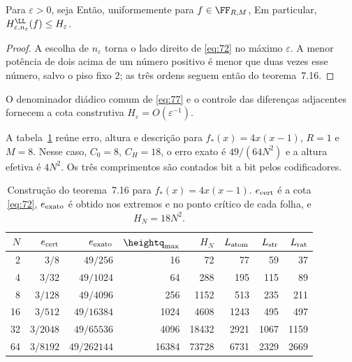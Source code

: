 \begin{corolario}
Para $\varepsilon>0$, seja
Então, uniformemente para $f\in\FF_{R,M}$,
Em particular, $H^{\LL}_{\varepsilon,n_\varepsilon}(f)\le H_\varepsilon$.
\end{corolario}
\begin{proof}
A escolha de $n_\varepsilon$ torna o lado direito de \eqref{eq:72} no máximo $\varepsilon$. A menor potência de dois acima de um número positivo é menor que duas vezes esse número, salvo o piso fixo $2$; as três ordens seguem então do teorema~7.16.
\end{proof}
O denominador diádico comum de \eqref{eq:77} e o controle das diferenças adjacentes fornecem a cota construtiva $H_\varepsilon=O(\varepsilon^{-1})$.

A tabela~\ref{tab:bits} reúne erro, altura e descrição para $f_*(x)=4x(x-1)$, $R=1$ e $M=8$. Nesse caso, $C_0=8$, $C_H=18$, o erro exato é $49/(64N^2)$ e a altura efetiva é $4N^2$. Os três comprimentos são contados bit a bit pelos codificadores.
\begin{table}[!htbp]\centering
\caption{Construção do teorema~7.16 para $f_*(x)=4x(x-1)$. $e_{\rm cert}$ é a cota \eqref{eq:72}, $e_{\rm exato}$ é obtido nos extremos e no ponto crítico de cada folha, e $H_N=18N^2$.}\label{tab:bits}
\small\renewcommand{\arraystretch}{1.4}
\begin{tabular}{rrrrrrrr}\toprule
$N$&$e_{\rm cert}$&$e_{\rm exato}$&$\heightq_{\max}$&$H_N$&$L_{\rm atom}$&$L_{\rm str}$&$L_{\rm rat}$\\\midrule
2&$3/8$&$49/256$&16&72&77&59&37\\
4&$3/32$&$49/1024$&64&288&195&115&89\\
8&$3/128$&$49/4096$&256&1152&513&235&211\\
16&$3/512$&$49/16384$&1024&4608&1243&495&497\\
32&$3/2048$&$49/65536$&4096&18432&2921&1067&1159\\
64&$3/8192$&$49/262144$&16384&73728&6731&2329&2669\\\bottomrule
\end{tabular}
\end{table}

